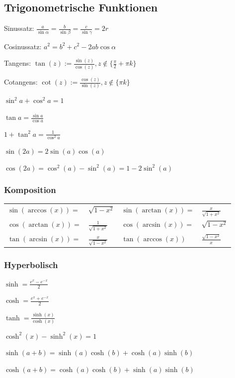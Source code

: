 \subsection{Trigonometrische Funktionen}
\begin{compactdesc}
    \item[Sinussatz:] $\frac{a}{\sin \alpha} = \frac{b}{\sin \beta} = \frac{c}{\sin \gamma} = 2r$
    \item[Cosinussatz:] $a^2 = b^2 + c^2 - 2ab \cos \alpha$
    \item[Tangens:] $\tan(z) := \frac{\sin(z)}{\cos(z)}, z \not\in \{\frac{\pi}{2} + \pi k\}$
    \item[Cotangens:] $\cot(z) := \frac{\cos(z)}{\sin(z)}, z \not\in \{\pi k\}$
\end{compactdesc}

\begin{compactitem}
    \item $\sin^2a + \cos^2a = 1$
    \item $\tan a = \frac{\sin a}{\cos a}$
    \item $1 + \tan^2 a = \frac{1}{\cos^2 a}$
    \item $\sin(2a) = 2\sin(a) \cos(a)$
    \item $\cos(2a) = \cos^2(a) - \sin^2(a) = 1 - 2 \sin^2(a)$
\end{compactitem}

\subsubsection{Komposition}
\begin{tabular}{l l | l l}
    $\sin(\arccos(x)) =$ & $\sqrt{1 - x^2}$ & $\sin(\arctan(x))=$ & $\frac{x}{\sqrt{1 + x^2} }$\\
    $\cos(\arctan(x)) =$ & $\frac{1}{\sqrt{ 1 + x^2}}$ & $\cos(\arcsin(x))=$ & $\sqrt{1 - x^2}$\\
    $\tan(\arcsin(x)) =$ & $\frac{x}{\sqrt{1 - x^2}}$ & $\tan(\arccos(x))$ & $\frac{\sqrt{1 - x^2}}{x}$\\
\end{tabular}

\subsubsection{Hyperbolisch}
\begin{compactitem}
    \item
        \begin{inparaitem}
            \item $\sinh = \frac{e^x - e^{-x}}{2}$
            \item $\cosh = \frac{e^x+e^{-x}}{2}$
            \item $\tanh = \frac{\sinh(x)}{\cosh(x)}$
        \end{inparaitem}

    \item $\cosh^2(x) - \sinh^2(x) = 1$
    \item $\sinh(a + b) = \sinh(a)\cosh(b) + \cosh(a)\sinh(b)$
    \item $\cosh(a + b) = \cosh(a)\cosh(b) + \sinh(a)\sinh(b)$
\end{compactitem}

